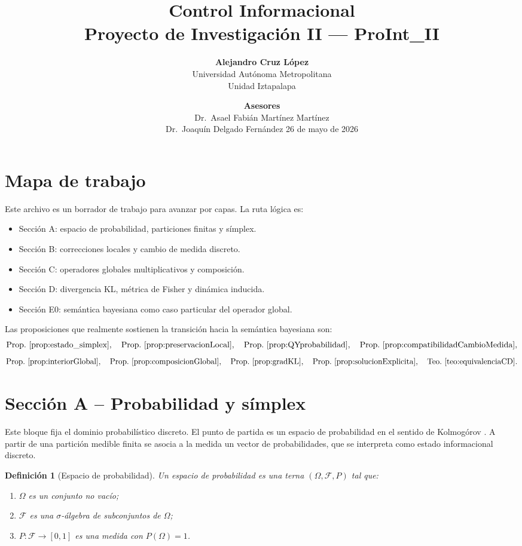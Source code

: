 ﻿\documentclass[12pt]{article}
\title{Control Informacional\\
\large Proyecto de Investigación II --- ProInt\_II}
\author{
\textbf{Alejandro Cruz López} \\
Universidad Autónoma Metropolitana \\
Unidad Iztapalapa
}
\date{
\vspace{1em}
\textbf{Asesores} \\[0.3em]
Dr.\ Asael Fabián Martínez Martínez \\
Dr.\ Joaquín Delgado Fernández
\vspace{1em}
26 de mayo de 2026
}
\newtheorem{definicion}{Definición}[section]
\begin{document}
\maketitle
\tableofcontents
\clearpage

\section{Mapa de trabajo}

Este archivo es un borrador de trabajo para avanzar por capas. La ruta lógica es:

\begin{itemize}
    \item Sección A: espacio de probabilidad, particiones finitas y símplex.
    \item Sección B: correcciones locales y cambio de medida discreto.
    \item Sección C: operadores globales multiplicativos y composición.
    \item Sección D: divergencia KL, métrica de Fisher y dinámica inducida.
    \item Sección E0: semántica bayesiana como caso particular del operador global.
\end{itemize}

Las proposiciones que realmente sostienen la transición hacia la semántica bayesiana son:
\[
\text{Prop.\ \ref{prop:estado_simplex}},\quad
\text{Prop.\ \ref{prop:preservacionLocal}},\quad
\text{Prop.\ \ref{prop:QYprobabilidad}},\quad
\text{Prop.\ \ref{prop:compatibilidadCambioMedida}},
\]
\[
\text{Prop.\ \ref{prop:interiorGlobal}},\quad
\text{Prop.\ \ref{prop:composicionGlobal}},\quad
\text{Prop.\ \ref{prop:gradKL}},\quad
\text{Prop.\ \ref{prop:solucionExplicita}},\quad
\text{Teo.\ \ref{teo:equivalenciaCD}}.
\]

\section{Sección A -- Probabilidad y símplex}

Este bloque fija el dominio probabilístico discreto. El punto de partida es un espacio de probabilidad en el sentido de Kolmogórov \citep{Kolmogorov1933}. A partir de una partición medible finita se asocia a la medida un vector de probabilidades, que se interpreta como estado informacional discreto.

\begin{definicion}[Espacio de probabilidad]\label{def:espacio_prob}
Un \emph{espacio de probabilidad} es una terna $(\Omega,\mathcal F,P)$ tal que:
\begin{enumerate}
    \item $\Omega$ es un conjunto no vacío;
    \item $\mathcal F$ es una $\sigma$-álgebra de subconjuntos de $\Omega$;
    \item $P:\mathcal F\to[0,1]$ es una medida con $P(\Omega)=1$.
\end{enumerate}
\end{definicion}
\end{document}

